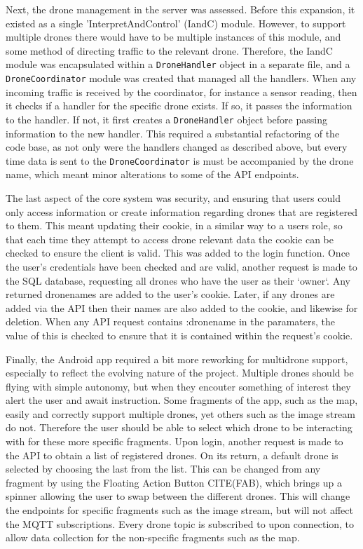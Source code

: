 \documentclass{article}
\begin{document}
Next, the drone management in the server was assessed. Before this expansion, it existed as a single 'InterpretAndControl' (IandC) module. However, to support multiple drones there would have to be multiple instances of this module, and some method of directing traffic to the relevant drone. Therefore, the IandC module was encapsulated within a \texttt{DroneHandler} object in a separate file, and a \texttt{DroneCoordinator} module was created that managed all the handlers. When any incoming traffic is received by the coordinator, for instance a sensor reading, then it checks if a handler for the specific drone exists. If so, it passes the information to the handler. If not, it first creates a \texttt{DroneHandler} object before passing information to the new handler. This required a substantial refactoring of the code base, as not only were the handlers changed as described above, but every time data is sent to the \texttt{DroneCoordinator} is must be accompanied by the drone name, which meant minor alterations to some of the API endpoints.

The last aspect of the core system was security, and ensuring that users could only access information or create information regarding drones that are registered to them. This meant updating their cookie, in a similar way to a users role, so that each time they attempt to access drone relevant data the cookie can be checked to ensure the client is valid. This was added to the login function. Once the user's credentials have been checked and are valid, another request is made to the SQL database, requesting all drones who have the user as their `owner`. Any returned dronenames are added to the user's cookie. Later, if any drones are added via the API then their names are also added to the cookie, and likewise for deletion. When any API request contains :dronename in the paramaters, the value of this is checked to ensure that it is contained within the request's cookie. 

Finally, the Android app required a bit more reworking for multidrone support, especially to reflect the evolving nature of the project. Multiple drones should be flying with simple autonomy, but when they encouter something of interest they alert the user and await instruction. Some fragments of the app, such as the map, easily and correctly support multiple drones, yet others such as the image stream do not. Therefore the user should be able to select which drone to be interacting with for these more specific fragments. Upon login, another request is made to the API to obtain a list of registered drones. On its return, a default drone is selected by choosing the last from the list. This can be changed from any fragment by using the Floating Action Button CITE(FAB), which brings up a spinner allowing the user to swap between the different drones. This will change the endpoints for specific fragments such as the image stream, but will not affect the MQTT subscriptions. Every drone topic is subscribed to upon connection, to allow data collection for the non-specific fragments such as the map. 
\end{document}
